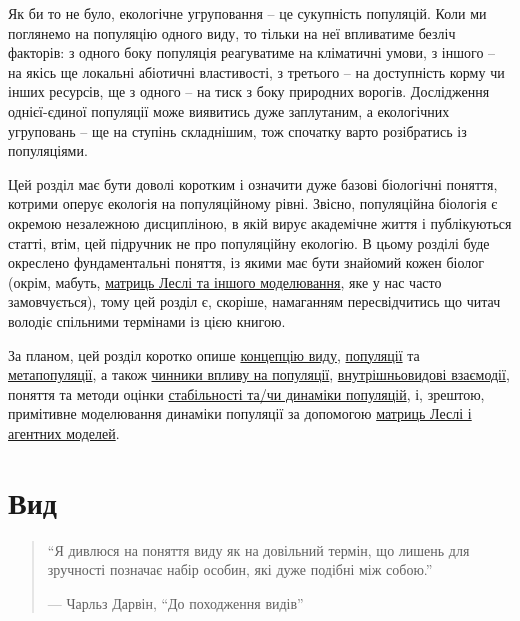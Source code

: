 \documentclass[
  11pt,
]{book}
\begin{document}
Як би то не було, екологічне угруповання -- це сукупність популяцій. Коли ми поглянемо на популяцію одного виду, то тільки на неї впливатиме безліч факторів: з одного боку популяція реагуватиме на кліматичні умови, з іншого -- на якісь ще локальні абіотичні властивості, з третього -- на доступність корму чи інших ресурсів, ще з одного -- на тиск з боку природних ворогів. Дослідження однієї-єдиної популяції може виявитись дуже заплутаним, а екологічних угруповань -- ще на ступінь складнішим, тож спочатку варто розібратись із популяціями.

Цей розділ має бути доволі коротким і означити дуже базові біологічні поняття, котрими оперує екологія на популяційному рівні. Звісно, популяційна біологія є окремою незалежною дисципліною, в якій вирує академічне життя і публікуються статті, втім, цей підручник не про популяційну екологію. В цьому розділі буде окреслено фундаментальні поняття, із якими має бути знайомий кожен біолог (окрім, мабуть, \hyperref[Leslie-matrix]{матриць Леслі та іншого моделювання}, яке у нас часто замовчується), тому цей розділ є, скоріше, намаганням пересвідчитись що читач володіє спільними термінами із цією книгою.

За планом, цей розділ коротко опише \hyperref[species]{концепцію виду}, \hyperref[population]{популяції} та \hyperref[metapopulation]{метапопуляції}, а також \hyperref[pop-factors]{чинники впливу на популяції}, \hyperref[intraspecific]{внутрішньовидові взаємодії}, поняття та методи оцінки \hyperref[pop-dynamics]{стабільності та/чи динаміки популяцій}, і, зрештою, примітивне моделювання динаміки популяції за допомогою \hyperref[Leslie-matrix]{матриць Леслі і агентних моделей}.

\section{Вид}\label{species}

\begin{quote}
``Я дивлюся на поняття виду як на довільний термін, що лишень для зручності позначає набір особин, які дуже подібні між собою.''

--- Чарльз Дарвін, ``До походження видів''
\end{quote}
\end{document}
